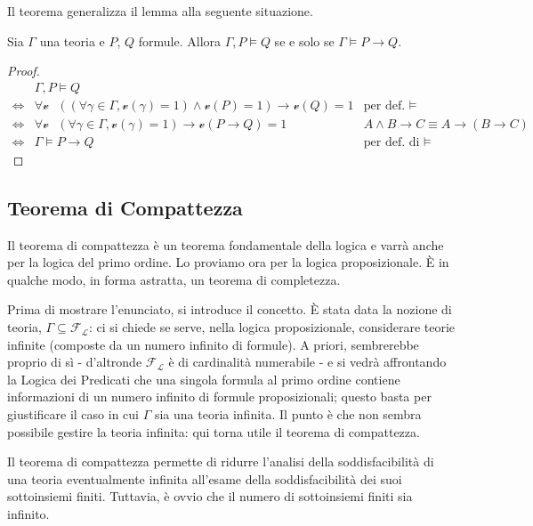 Il teorema generalizza il lemma alla seguente situazione. 
\begin{teo}
\label{thm:deduzione}
Sia $\Gamma$ una teoria 
e $P$, $Q$ formule. Allora $\Gamma,P \models Q$ se e solo se
$\Gamma \models P \rightarrow Q$. 
\end{teo}
\begin{proof}
\begin{align*}
  &\Gamma, P \models Q \\
  \iff & \forall \mathcal{v} ~~~ ((\forall \gamma \in \Gamma, \mathcal{v}(\gamma) = 1) \land \mathcal{v}(P) = 1) \rightarrow \mathcal{v}(Q) = 1 & \text{per def. } \models \\
  \iff & \forall \mathcal{v} ~~~ (\forall \gamma \in \Gamma, \mathcal{v}(\gamma) = 1) \rightarrow \mathcal{v}(P \rightarrow Q) = 1 & A \land B \rightarrow C \equiv A \rightarrow (B \rightarrow C) \\
  \iff & \Gamma \models P \rightarrow Q & \text{per def. di } \models
\end{align*}
\end{proof}

\subsection{Teorema di Compattezza}
Il teorema di compattezza è un teorema fondamentale della logica e varrà 
anche per la logica del primo ordine. Lo proviamo ora per la logica proposizionale. 
\`E in qualche modo, in forma astratta, un teorema di completezza. 

Prima di mostrare l'enunciato, si introduce il concetto. \`E stata data la 
nozione di teoria, $\Gamma \subseteq \mathscr{F_L}$: ci si chiede se serve, nella logica 
proposizionale, considerare teorie infinite (composte da un numero 
infinito di formule). A priori, sembrerebbe proprio di sì - d'altronde $\mathscr{F_L}$ è di 
cardinalità numerabile - e si vedrà affrontando
la Logica dei Predicati che una singola formula al primo ordine contiene informazioni 
di un numero infinito di formule proposizionali; questo basta per giustificare il caso 
in cui $\Gamma$ sia una teoria infinita. Il punto è che non sembra possibile 
gestire la teoria infinita: qui torna utile il teorema di compattezza. 
 

Il teorema di compattezza permette di ridurre l'analisi della soddisfacibilità di 
una teoria eventualmente infinita all'esame della soddisfacibilità dei suoi 
sottoinsiemi finiti. Tuttavia, è ovvio che il numero di sottoinsiemi finiti 
sia infinito. 
\noindent

